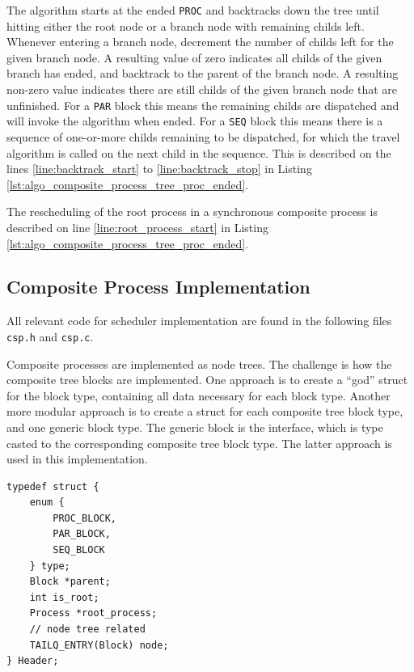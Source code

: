 The algorithm starts at the ended \texttt{PROC} and backtracks down the tree until hitting either the root node or a branch node with remaining childs left. Whenever entering a branch node, decrement the number of childs left for the given branch node. A resulting value of zero indicates all childs of the given branch has ended, and backtrack to the parent of the branch node. A resulting non\hyp{}zero value indicates there are still childs of the given branch node that are unfinished. For a \texttt{PAR} block this means the remaining childs are dispatched and will invoke the algorithm when ended. For a \texttt{SEQ} block this means there is a sequence of one\hyp{}or\hyp{}more childs remaining to be dispatched, for which the travel algorithm is called on the next child in the sequence. This is described on the lines \ref{line:backtrack_start} to \ref{line:backtrack_stop} in Listing \ref{lst:algo_composite_process_tree_proc_ended}.

The rescheduling of the root process in a synchronous composite process is described on line \ref{line:root_process_start} in Listing \ref{lst:algo_composite_process_tree_proc_ended}.


\subsection{Composite Process Implementation}

All relevant code for scheduler implementation are found in the following files \texttt{csp.h} and \texttt{csp.c}.

Composite processes are implemented as node trees. The challenge is how the composite tree blocks are implemented. One approach is to create a ``god'' struct for the block type, containing all data necessary for each block type. Another more modular approach is to create a struct for each composite tree block type, and one generic block type. The generic block is the interface, which is type casted to the corresponding composite tree block type. The latter approach is used in this implementation.

\noindent\begin{minipage}{\textwidth}
\begin{lstlisting}[style={CustomC},caption={Header struct type},label={lst:header_struct_type}]
typedef struct {
    enum {
        PROC_BLOCK,
        PAR_BLOCK,
        SEQ_BLOCK
    } type;
    Block *parent;
    int is_root;
    Process *root_process;
    // node tree related
    TAILQ_ENTRY(Block) node;
} Header;
\end{lstlisting}
\end{minipage}

